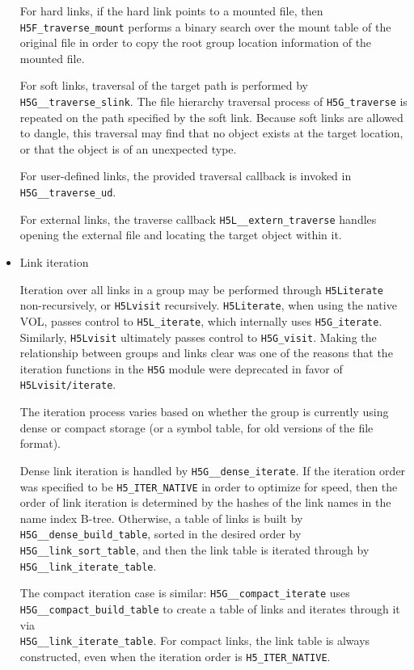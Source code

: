 \begin{itemize}
For hard links, if the hard link points to a mounted file, then \texttt{H5F\_traverse\_mount} performs a binary search over the mount table of the original file in order to copy the root group location information of the mounted file. 

For soft links, traversal of the target path is performed by \texttt{H5G\_\_traverse\_slink}. The file hierarchy traversal process of \texttt{H5G\_traverse} is repeated on the path specified by the soft link. Because soft links are allowed to dangle, this traversal may find that no object exists at the target location, or that the object is of an unexpected type.

For user-defined links, the provided traversal callback is invoked in \texttt{H5G\_\_traverse\_ud}. 

For external links, the traverse callback \texttt{H5L\_\_extern\_traverse} handles opening the external file and locating the target object within it.

    \item Link iteration

Iteration over all links in a group may be performed through \texttt{H5Literate} non-recursively, or \texttt{H5Lvisit} recursively. \texttt{H5Literate}, when using the native VOL, passes control to \texttt{H5L\_iterate}, which internally uses \texttt{H5G\_iterate}. Similarly, \texttt{H5Lvisit} ultimately passes control to \texttt{H5G\_visit}. Making the relationship between groups and links clear was one of the reasons that the iteration functions in the \texttt{H5G} module were deprecated in favor of \texttt{H5Lvisit/iterate}. 

The iteration process varies based on whether the group is currently using dense or compact storage (or a symbol table, for old versions of the file format). 

Dense link iteration is handled by \texttt{H5G\_\_dense\_iterate}. If the iteration order was specified to be \texttt{H5\_ITER\_NATIVE} in order to optimize for speed, then the order of link iteration is determined by the hashes of the link names in the name index B-tree. Otherwise, a table of links is built by \texttt{H5G\_\_dense\_build\_table}, sorted in the desired order by \texttt{H5G\_\_link\_sort\_table}, and then the link table is iterated through by \texttt{H5G\_\_link\_iterate\_table}. %

The compact iteration case is similar: \texttt{H5G\_\_compact\_iterate} uses \\ \texttt{H5G\_\_compact\_build\_table} to create a table of links and iterates through it via \\ \texttt{H5G\_\_link\_iterate\_table}. For compact links, the link table is always constructed, even when the iteration order is \texttt{H5\_ITER\_NATIVE}. 


\end{itemize}
